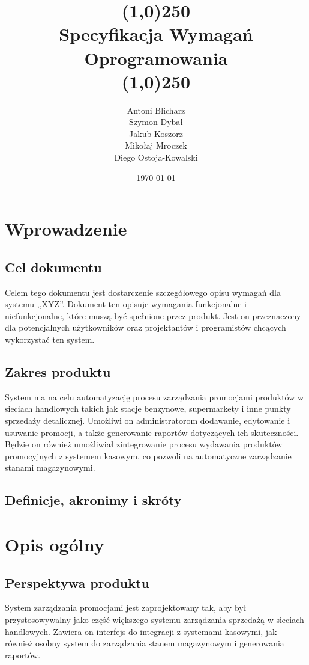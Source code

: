 \documentclass[a4paper,12pt]{article}
\title{\line(1,0){250}\\ Specyfikacja Wymagań Oprogramowania \\ \line(1,0){250}}
\author{Antoni Blicharz\\
        Szymon Dybał\\
        Jakub Koszorz\\
        Mikołaj Mroczek\\
        Diego Ostoja-Kowalski\\}
\date{\today}
\begin{document}
\begin{titlepage}
    \maketitle
\end{titlepage}
\tableofcontents
\newpage

\section{Wprowadzenie}

\subsection{Cel dokumentu}
Celem tego dokumentu jest dostarczenie szczegółowego opisu wymagań dla systemu ,,XYZ''.
Dokument ten opisuje wymagania funkcjonalne i niefunkcjonalne, które muszą być spełnione przez produkt.
Jest on przeznaczony dla potencjalnych użytkowników oraz projektantów i programistów chcących wykorzystać ten system.

\subsection{Zakres produktu}
System ma na celu automatyzację procesu zarządzania promocjami produktów w sieciach handlowych takich jak stacje benzynowe, supermarkety i inne punkty sprzedaży detalicznej.
Umożliwi on administratorom dodawanie, edytowanie i usuwanie promocji, a także generowanie raportów dotyczących ich skuteczności.
Będzie on również umożliwiał zintegrowanie procesu wydawania produktów promocyjnych z systemem kasowym, co pozwoli na automatyczne zarządzanie stanami magazynowymi.

\subsection{Definicje, akronimy i skróty}


\section{Opis ogólny}
\subsection{Perspektywa produktu}
System zarządzania promocjami jest zaprojektowany tak, aby był przystosowywalny jako część większego systemu zarządzania sprzedażą w sieciach handlowych.
Zawiera on interfejs do integracji z systemami kasowymi, jak również osobny system do zarządzania stanem magazynowym i generowania raportów.
\end{document}
